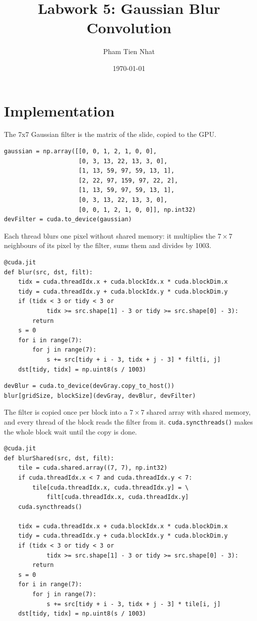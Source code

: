 \documentclass{article}
\title{Labwork 5: Gaussian Blur Convolution}
\author{Pham Tien Nhat}
\date{\today}
\begin{document}
\maketitle

\section{Implementation}


The 7x7 Gaussian filter is the matrix of the slide,  copied to the GPU.

\begin{Verbatim}
gaussian = np.array([[0, 0, 1, 2, 1, 0, 0],
                     [0, 3, 13, 22, 13, 3, 0],
                     [1, 13, 59, 97, 59, 13, 1],
                     [2, 22, 97, 159, 97, 22, 2],
                     [1, 13, 59, 97, 59, 13, 1],
                     [0, 3, 13, 22, 13, 3, 0],
                     [0, 0, 1, 2, 1, 0, 0]], np.int32)
devFilter = cuda.to_device(gaussian)
\end{Verbatim}

Each thread blurs one pixel without shared memory: it multiplies the $7 \times 7$ neighbours of its pixel by the filter, sums them and divides by 1003. 

\begin{Verbatim}
@cuda.jit
def blur(src, dst, filt):
    tidx = cuda.threadIdx.x + cuda.blockIdx.x * cuda.blockDim.x
    tidy = cuda.threadIdx.y + cuda.blockIdx.y * cuda.blockDim.y
    if (tidx < 3 or tidy < 3 or
            tidx >= src.shape[1] - 3 or tidy >= src.shape[0] - 3):
        return
    s = 0
    for i in range(7):
        for j in range(7):
            s += src[tidy + i - 3, tidx + j - 3] * filt[i, j]
    dst[tidy, tidx] = np.uint8(s / 1003)
\end{Verbatim}

\begin{Verbatim}
devBlur = cuda.to_device(devGray.copy_to_host())
blur[gridSize, blockSize](devGray, devBlur, devFilter)
\end{Verbatim}

The filter is copied once per block into a $7 \times 7$ shared array with shared memory, and every thread of the block reads the filter from it. \texttt{cuda.syncthreads()} makes the whole block wait until the copy is done.

\begin{Verbatim}
@cuda.jit
def blurShared(src, dst, filt):
    tile = cuda.shared.array((7, 7), np.int32)
    if cuda.threadIdx.x < 7 and cuda.threadIdx.y < 7:
        tile[cuda.threadIdx.x, cuda.threadIdx.y] = \
            filt[cuda.threadIdx.x, cuda.threadIdx.y]
    cuda.syncthreads()

    tidx = cuda.threadIdx.x + cuda.blockIdx.x * cuda.blockDim.x
    tidy = cuda.threadIdx.y + cuda.blockIdx.y * cuda.blockDim.y
    if (tidx < 3 or tidy < 3 or
            tidx >= src.shape[1] - 3 or tidy >= src.shape[0] - 3):
        return
    s = 0
    for i in range(7):
        for j in range(7):
            s += src[tidy + i - 3, tidx + j - 3] * tile[i, j]
    dst[tidy, tidx] = np.uint8(s / 1003)
\end{Verbatim}
\end{document}
